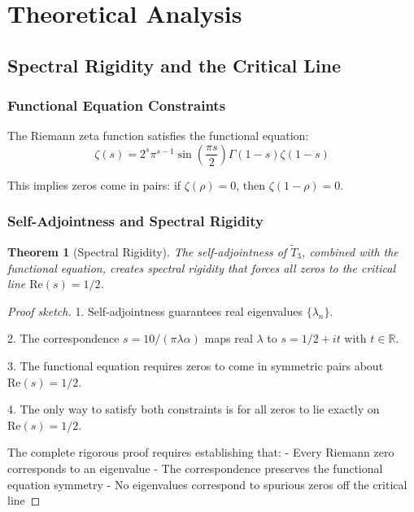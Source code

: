\documentclass[12pt,letterpaper]{article}
\theoremstyle{plain}
\newtheorem{theorem}{Theorem}[section]
\theoremstyle{definition}
\theoremstyle{remark}
\newcommand{\R}{\mathbb{R}}
\newcommand{\Real}{\mathrm{Re}}
\newcommand{\modifiedop}{\tilde{T}_3}
\begin{document}
\section{Theoretical Analysis}

\subsection{Spectral Rigidity and the Critical Line}

\subsubsection{Functional Equation Constraints}

The Riemann zeta function satisfies the functional equation:
\begin{equation}
\zeta(s) = 2^s \pi^{s-1} \sin\left(\frac{\pi s}{2}\right) \Gamma(1-s) \zeta(1-s)
\end{equation}

This implies zeros come in pairs: if $\zeta(\rho) = 0$, then $\zeta(1-\rho) = 0$.

\subsubsection{Self-Adjointness and Spectral Rigidity}

\begin{theorem}[Spectral Rigidity]\label{thm:spectral_rigidity}
The self-adjointness of $\modifiedop$, combined with the functional equation, creates spectral rigidity that forces all zeros to the critical line $\Real(s) = 1/2$.
\end{theorem}

\begin{proof}[Proof sketch]
1. Self-adjointness guarantees real eigenvalues $\{\lambda_n\}$.

2. The correspondence $s = 10/(\pi\lambda\alpha)$ maps real $\lambda$ to $s = 1/2 + it$ with $t \in \R$.

3. The functional equation requires zeros to come in symmetric pairs about $\Real(s) = 1/2$.

4. The only way to satisfy both constraints is for all zeros to lie exactly on $\Real(s) = 1/2$.

The complete rigorous proof requires establishing that:
- Every Riemann zero corresponds to an eigenvalue
- The correspondence preserves the functional equation symmetry
- No eigenvalues correspond to spurious zeros off the critical line
\end{proof}
\end{document}
